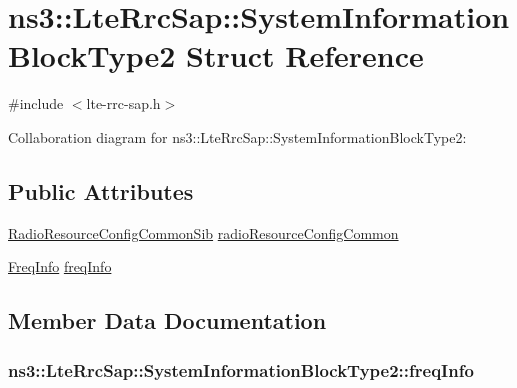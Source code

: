 \hypertarget{structns3_1_1LteRrcSap_1_1SystemInformationBlockType2}{}\section{ns3\+:\+:Lte\+Rrc\+Sap\+:\+:System\+Information\+Block\+Type2 Struct Reference}
\label{structns3_1_1LteRrcSap_1_1SystemInformationBlockType2}


{\ttfamily \#include $<$lte-\/rrc-\/sap.\+h$>$}



Collaboration diagram for ns3\+:\+:Lte\+Rrc\+Sap\+:\+:System\+Information\+Block\+Type2\+:
\subsection*{Public Attributes}
\begin{DoxyCompactItemize}
\item 
\hyperlink{structns3_1_1LteRrcSap_1_1RadioResourceConfigCommonSib}{Radio\+Resource\+Config\+Common\+Sib} \hyperlink{structns3_1_1LteRrcSap_1_1SystemInformationBlockType2_ae78bdbb96b0015be40a0e918215e61d4}{radio\+Resource\+Config\+Common}
\item 
\hyperlink{structns3_1_1LteRrcSap_1_1FreqInfo}{Freq\+Info} \hyperlink{structns3_1_1LteRrcSap_1_1SystemInformationBlockType2_ab1a8e3f53845dc745c1e8da0e1eabee9}{freq\+Info}
\end{DoxyCompactItemize}


\subsection{Member Data Documentation}
\subsubsection[{\texorpdfstring{freq\+Info}{freqInfo}}]{ ns3\+::\+Lte\+Rrc\+Sap\+::\+System\+Information\+Block\+Type2\+::freq\+Info}\hypertarget{structns3_1_1LteRrcSap_1_1SystemInformationBlockType2_ab1a8e3f53845dc745c1e8da0e1eabee9}{}\label{structns3_1_1LteRrcSap_1_1SystemInformationBlockType2_ab1a8e3f53845dc745c1e8da0e1eabee9}
